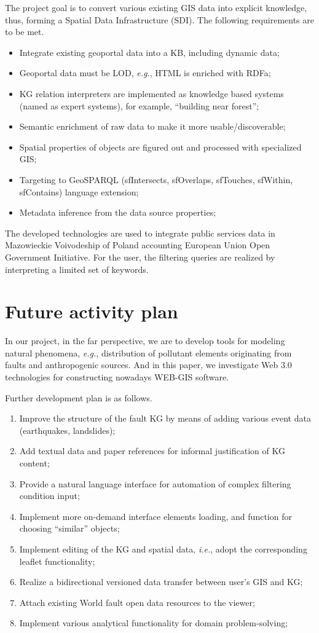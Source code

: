 \documentclass[
]{ceurart}
\begin{document}
   The project \cite{iwaniak1,iwaniak17} goal is to convert various existing GIS data into explicit knowledge, thus, forming a Spatial Data Infrastructure (SDI). The following requirements are to be met.
  \begin{itemize}
  \item Integrate existing geoportal data into a KB, including dynamic data;
  \item Geoportal data must be LOD, \emph{e.g.}, HTML is enriched with RDFa;
  \item KG relation interpreters are implemented as knowledge based systems (named as expert systems), for example, ``building near forest'';
  \item Semantic enrichment of raw data to make it more usable/discoverable;
  \item Spatial properties of objects are figured out and processed with specialized GIS;
  \item Targeting to GeoSPARQL (sfIntersects, sfOverlaps, sfTouches, sfWithin, sfContains) language extension;
  \item Metadata inference from the data source properties;
  \end{itemize}
  The developed technologies are used to integrate public services data in Mazowieckie Voivodeship of Poland accounting European Union Open Government Initiative.  For the user, the filtering queries are realized by interpreting a limited set of keywords.

\section{Future activity plan}

In our project, in the far perspective, we are to develop tools for modeling natural phenomena, \emph{e.g.}, distribution of pollutant elements originating from faults and anthropogenic sources.  And in this paper, we investigate Web 3.0 technologies for constructing nowadays WEB-GIS software.

Further development plan is as follows.
\begin{enumerate}
\item Improve the structure of the fault KG by means of adding various event data (earthquakes, landslides);
\item Add textual data and paper references for informal justification of KG content;
\item Provide a natural language interface for automation of complex filtering condition input;
\item Implement more on-demand interface elements loading, and function for choosing ``similar'' objects;
\item Implement editing of the KG and spatial data, \emph{i.e.}, adopt the corresponding leaflet functionality;
\item Realize a bidirectional versioned data transfer between user's GIS and KG;
\item Attach existing World fault open data resources to the viewer;
\item Implement various analytical functionality for domain problem-solving;
\end{enumerate}
\end{document}
